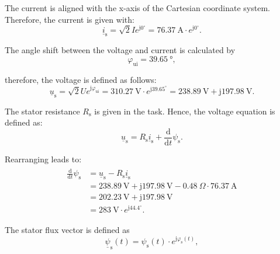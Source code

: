 \begin{solutionblock}
    The current is aligned with the x-axis of the Cartesian coordinate system. Therefore, the current is given with:
    \begin{equation}
        \underline{i}_{\mathrm{s}} = \sqrt{2} I e^{\mathrm{j}0^{\circ}}
        = \SI{76.37}{\ampere} \cdot e^{\mathrm{j}0^{\circ}}.
    \end{equation}

    The angle shift between the voltage and current is calculated by
    \begin{equation}
        \varphi_{\mathrm{ui}} = \SI{39.65}{\degree},
    \end{equation}

    therefore, the voltage is defined as follows:
    \begin{equation}
        \underline{u}_{\mathrm{s}} = \sqrt{2} U e^{\mathrm{j} \varphi_{\mathrm{ui}}}
        = \SI{310.27}{\volt} \cdot e^{\mathrm{j}39.65^{\circ}}
        = \SI{238.89}{\volt} + \mathrm{j} \SI{197.98}{\volt}.
    \end{equation}

    The stator resistance $R_{\mathrm{s}}$ is given in the task. Hence, the voltage equation is defined as:
    \begin{equation}
        \underline{u}_{\mathrm{s}} = R_{\mathrm{s}} \underline{i}_{\mathrm{s}} + \frac{\mathrm{d}}{\mathrm{d}t}\psi_{\mathrm{s}}.
    \end{equation}

    Rearranging leads to:
    \begin{align}
        \begin{split}
        \frac{\mathrm{d}}{\mathrm{d}t}\psi_{\mathrm{s}} &= \underline{u}_{\mathrm{s}} - R_{\mathrm{s}} \underline{i}_{\mathrm{s}} \\
        &= \SI{238.89}{\volt} + \mathrm{j} \SI{197.98}{\volt} - \SI{0.48}{\Omega} \cdot \SI{76.37}{\ampere} \\
        &= \SI{202.23}{\volt} + \mathrm{j} \SI{197.98}{\volt} \\
        &= \SI{283}{\volt} \cdot e^{\mathrm{j}44.4^{\circ}}.
        \end{split}
    \end{align}

    The stator flux vector is defined as
    \begin{equation}
        \underline{\psi}_{\mathrm{s}}(t) = \psi_{\mathrm{s}}(t) \cdot e^{\mathrm{j}\varphi_{\mathrm{s}}(t)},
    \end{equation}


\end{solutionblock}
